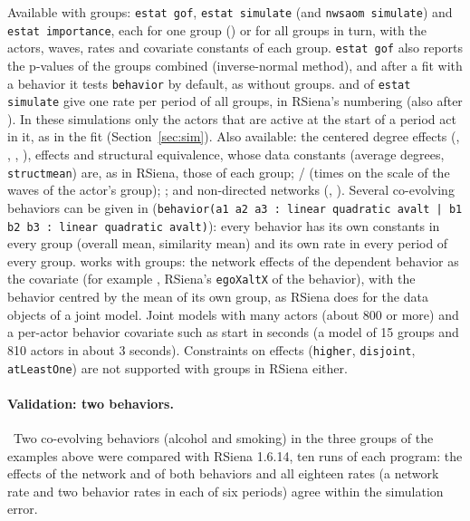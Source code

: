 Available with groups: \texttt{estat gof}, \texttt{estat simulate} (and \texttt{nwsaom simulate}) and \texttt{estat importance}, each for one group () or for all groups in turn, with the actors, waves, rates and covariate constants of each group. \texttt{estat gof} also reports the p-values of the groups combined (inverse-normal method), and after a fit with a behavior it tests \texttt{behavior} by default, as without groups.  and  of \texttt{estat simulate} give one rate per period of all groups, in RSiena's numbering (also after ). In these simulations only the actors that are active at the start of a period act in it, as in the fit (Section~\ref{sec:sim}). Also available: the centered degree effects (, , , ),  effects and structural equivalence, whose data constants (average degrees, \texttt{structmean}) are, as in RSiena, those of each group; / (times on the scale of the waves of the actor's group); ; and non-directed networks (, ). Several co-evolving behaviors can be given in  (\texttt{behavior(a1 a2 a3 : linear quadratic avalt | b1 b2 b3 : linear quadratic avalt)}): every behavior has its own constants in every group (overall mean, similarity mean) and its own rate in every period of every group.  works with groups: the network effects of the dependent behavior as the covariate (for example , RSiena's \texttt{egoXaltX} of the behavior), with the behavior centred by the mean of its own group, as RSiena does for the data objects of a joint model. Joint models with many actors (about 800 or more) and a per-actor behavior covariate such as  start in seconds (a model of 15 groups and 810 actors in about 3 seconds).
Constraints on effects (\texttt{higher}, \texttt{disjoint}, \texttt{atLeastOne}) are not supported with groups in RSiena either.

\paragraph{Validation: two behaviors.}\ Two co-evolving behaviors (alcohol and smoking) in the three groups of the examples above were compared with RSiena 1.6.14, ten runs of each program: the effects of the network and of both behaviors and all eighteen rates (a network rate and two behavior rates in each of six periods) agree within the simulation error.

